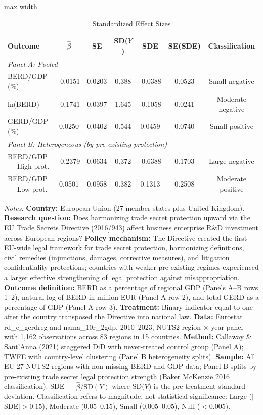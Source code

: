 \begin{table}[htbp]
\centering
\caption{Standardized Effect Sizes}
\label{tab:sde}
\begin{adjustbox}{max width=\textwidth}
\begin{tabular}{lcccccc}
\hline\hline
Outcome & $\hat{\beta}$ & SE & SD($Y$) & SDE & SE(SDE) & Classification \\
\hline
\multicolumn{7}{l}{\textit{Panel A: Pooled}} \\
BERD/GDP (\%) & -0.0151 & 0.0203 & 0.388 & -0.0388 & 0.0523 & Small negative \\
ln(BERD) & -0.1741 & 0.0397 & 1.645 & -0.1058 & 0.0241 & Moderate negative \\
GERD/GDP (\%) & 0.0250 & 0.0402 & 0.544 & 0.0459 & 0.0740 & Small positive \\
\hline
\multicolumn{7}{l}{\textit{Panel B: Heterogeneous (by pre-existing protection)}} \\
BERD/GDP --- High prot. & -0.2379 & 0.0634 & 0.372 & -0.6388 & 0.1703 & Large negative \\
BERD/GDP --- Low prot. & 0.0501 & 0.0958 & 0.382 & 0.1313 & 0.2508 & Moderate positive \\
\hline\hline
\end{tabular}
\end{adjustbox}
\begin{tablenotes}[flushleft]
\small
\item \textit{Notes:} \textbf{Country:} European Union (27 member states plus United Kingdom). \textbf{Research question:} Does harmonizing trade secret protection upward via the EU Trade Secrets Directive (2016/943) affect business enterprise R\&D investment across European regions? \textbf{Policy mechanism:} The Directive created the first EU-wide legal framework for trade secret protection, harmonizing definitions, civil remedies (injunctions, damages, corrective measures), and litigation confidentiality protections; countries with weaker pre-existing regimes experienced a larger effective strengthening of legal protection against misappropriation. \textbf{Outcome definition:} BERD as a percentage of regional GDP (Panels A--B rows 1--2), natural log of BERD in million EUR (Panel A row 2), and total GERD as a percentage of GDP (Panel A row 3). \textbf{Treatment:} Binary indicator equal to one after the country transposed the Directive into national law. \textbf{Data:} Eurostat rd\_e\_gerdreg and nama\_10r\_2gdp, 2010--2023, NUTS2 region $\times$ year panel with 1,162 observations across 83 regions in 15 countries. \textbf{Method:} Callaway \& Sant'Anna (2021) staggered DiD with never-treated control group (Panel A); TWFE with country-level clustering (Panel B heterogeneity splits). \textbf{Sample:} All EU-27 NUTS2 regions with non-missing BERD and GDP data; Panel B splits by pre-existing trade secret legal protection strength (Baker McKenzie 2016 classification). SDE $= \hat{\beta} / \text{SD}(Y)$ where SD($Y$) is the pre-treatment standard deviation. Classification refers to magnitude, not statistical significance: Large ($|$SDE$| > 0.15$), Moderate ($0.05$--$0.15$), Small ($0.005$--$0.05$), Null ($< 0.005$).
\end{tablenotes}
\end{table}
